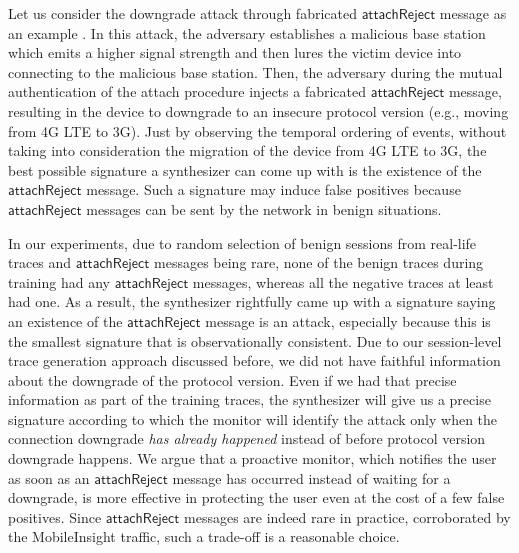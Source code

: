 Let us consider the downgrade attack through fabricated $\mathsf{attachReject}$ message  as an example \cite{privacy_ndss16}.
In this attack, the adversary establishes a malicious base
station which emits a higher signal strength and then lures the victim device into connecting to the malicious base station.
Then, the adversary during the mutual authentication of the attach procedure injects a fabricated $\mathsf{attachReject}$ message,
resulting in the device to downgrade to an insecure protocol version (e.g., moving from 4G LTE to 3G).
Just by observing the temporal ordering of events, without taking into consideration the migration of the device from 4G LTE to 3G, the best possible
signature a synthesizer can come up with is the existence of the $\mathsf{attachReject}$ message. Such a signature
may induce false positives because $\mathsf{attachReject}$ messages can be sent by the network in benign situations.

In our experiments, due to random selection of benign sessions from real-life traces and $\mathsf{attachReject}$
messages being rare, none of the benign traces during
training had any $\mathsf{attachReject}$ messages, whereas all the negative traces at least had one.
As a result, the synthesizer rightfully came up with a signature saying an existence of
the $\mathsf{attachReject}$ message is an attack, especially because this is the smallest signature that is
observationally consistent. Due to our session-level trace generation approach discussed before,
we did not have faithful information about the downgrade of the protocol version.
Even if we had that precise information as part of the training traces, the synthesizer will give us a precise
signature according to which the monitor will identify the attack only
when the connection downgrade \emph{has already happened} instead of before protocol version downgrade happens.
We argue that a proactive monitor, which notifies the user as soon as an $\mathsf{attachReject}$ message has occurred instead
of waiting for a downgrade, is more effective in protecting the user even  at the cost of a
few false positives.  Since $\mathsf{attachReject}$ messages are indeed rare in practice,
corroborated by the MobileInsight traffic, such a trade-off is a reasonable
choice.

